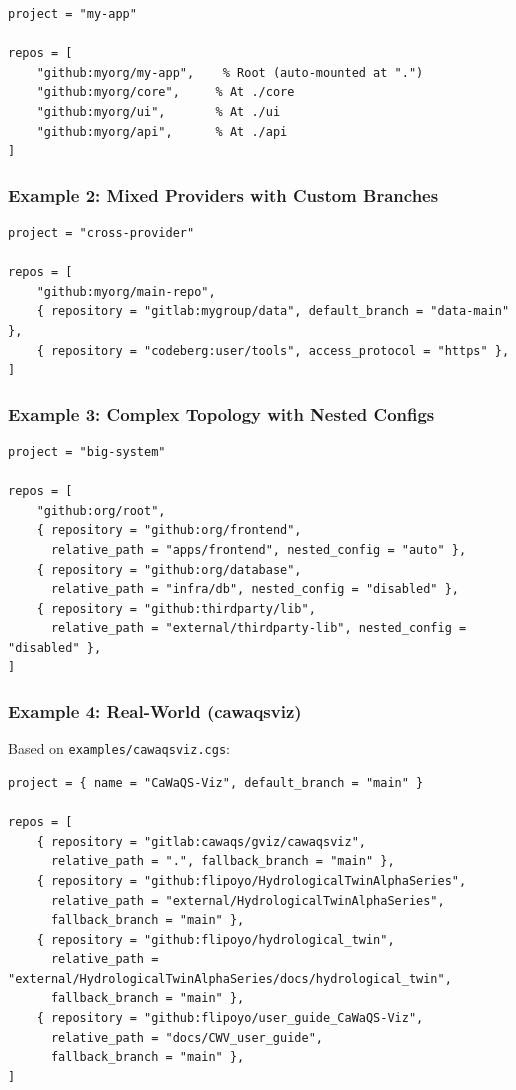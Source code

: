 \begin{lstlisting}
project = "my-app"

repos = [
    "github:myorg/my-app",    % Root (auto-mounted at ".")
    "github:myorg/core",     % At ./core
    "github:myorg/ui",       % At ./ui
    "github:myorg/api",      % At ./api
]
\end{lstlisting}

\subsubsection{Example 2: Mixed Providers with Custom Branches}

\begin{lstlisting}
project = "cross-provider"

repos = [
    "github:myorg/main-repo",
    { repository = "gitlab:mygroup/data", default_branch = "data-main" },
    { repository = "codeberg:user/tools", access_protocol = "https" },
]
\end{lstlisting}

\subsubsection{Example 3: Complex Topology with Nested Configs}

\begin{lstlisting}
project = "big-system"

repos = [
    "github:org/root",
    { repository = "github:org/frontend", 
      relative_path = "apps/frontend", nested_config = "auto" },
    { repository = "github:org/database", 
      relative_path = "infra/db", nested_config = "disabled" },
    { repository = "github:thirdparty/lib", 
      relative_path = "external/thirdparty-lib", nested_config = "disabled" },
]
\end{lstlisting}

\subsubsection{Example 4: Real-World (cawaqsviz)}

Based on \texttt{examples/cawaqsviz.cgs}:

\begin{lstlisting}
project = { name = "CaWaQS-Viz", default_branch = "main" }

repos = [
    { repository = "gitlab:cawaqs/gviz/cawaqsviz",
      relative_path = ".", fallback_branch = "main" },
    { repository = "github:flipoyo/HydrologicalTwinAlphaSeries",
      relative_path = "external/HydrologicalTwinAlphaSeries",
      fallback_branch = "main" },
    { repository = "github:flipoyo/hydrological_twin",
      relative_path = "external/HydrologicalTwinAlphaSeries/docs/hydrological_twin",
      fallback_branch = "main" },
    { repository = "github:flipoyo/user_guide_CaWaQS-Viz",
      relative_path = "docs/CWV_user_guide",
      fallback_branch = "main" },
]
\end{lstlisting}

